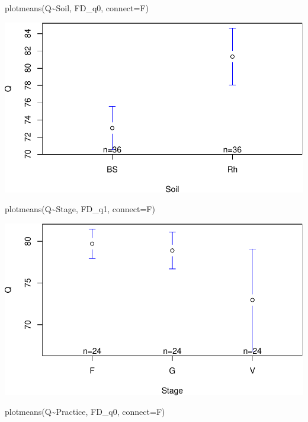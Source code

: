 \documentclass[]{interact}
\theoremstyle{plain}%
\theoremstyle{definition}
\theoremstyle{remark}
\newenvironment{Shaded}{\begin{snugshade}}{\end{snugshade}}
\newcommand{\AttributeTok}[1]{\textcolor[rgb]{0.77,0.63,0.00}{#1}}
\newcommand{\FunctionTok}[1]{\textcolor[rgb]{0.00,0.00,0.00}{#1}}
\newcommand{\NormalTok}[1]{#1}
\newcommand{\SpecialCharTok}[1]{\textcolor[rgb]{0.00,0.00,0.00}{#1}}
\begin{document}
\begin{Shaded}
\begin{Highlighting}[]
\FunctionTok{plotmeans}\NormalTok{(Q}\SpecialCharTok{\textasciitilde{}}\NormalTok{Soil, FD\_q0, }\AttributeTok{connect=}\NormalTok{F)}
\end{Highlighting}
\end{Shaded}

\includegraphics{Doc_pdf_files/figure-latex/unnamed-chunk-12-2.pdf}

\begin{Shaded}
\begin{Highlighting}[]
\FunctionTok{plotmeans}\NormalTok{(Q}\SpecialCharTok{\textasciitilde{}}\NormalTok{Stage, FD\_q1, }\AttributeTok{connect=}\NormalTok{F)}
\end{Highlighting}
\end{Shaded}

\includegraphics{Doc_pdf_files/figure-latex/unnamed-chunk-12-3.pdf}

\begin{Shaded}
\begin{Highlighting}[]
\FunctionTok{plotmeans}\NormalTok{(Q}\SpecialCharTok{\textasciitilde{}}\NormalTok{Practice, FD\_q0, }\AttributeTok{connect=}\NormalTok{F)}
\end{Highlighting}
\end{Shaded}
\end{document}
